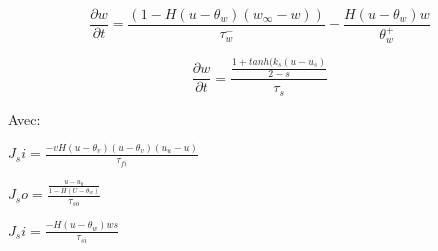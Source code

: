 \documentclass[a4paper,12pt,twoside]{report}
\begin{document}
\begin{equation}
\frac{\partial w}{\partial t}=\frac{(1-H(u-\theta_w)(w_\infty -w))}{\tau_w^-}-\frac{H(u-\theta_w)w}{\theta_w^+}
\end{equation}

\begin{equation}
\frac{\partial w}{\partial t}=\frac{\frac{1+tanh(k_s(u-u_s)}{2-s}}{\tau_s}
\end{equation}

Avec:

$J_si=\frac{-vH(u-\theta_v)(u-\theta_v)(u_u-u)}{\tau_{fi}}$


$J_so=\frac{\frac{u-u_0}{1-H(U-\theta_w)}}{\tau_{so}}$


$J_si=\frac{-H(u-\theta_w)ws}{\tau_{si}}$
\end{document}
